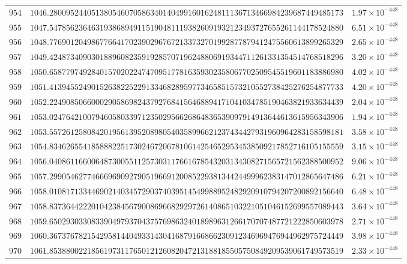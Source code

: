 \documentclass[12pt,reqno]{amsart}
\theoremstyle{remark}
\begin{document}
\begin{longtable}{clc}
$954$ & $1046.2800952440513805460705863401404991601624811136713466984239687449485173$ & $1.97\times 10^{-448}$ \\
$955$ & $1047.5478562364631938689491151904811193826091932123493727655261144178524880$ & $6.51\times 10^{-448}$ \\
$956$ & $1048.7769012049867766417023902967672133732701992877879412475560613899265329$ & $2.65\times 10^{-448}$ \\
$957$ & $1049.4248734090301889608235919285707196248806919344711261331354514768518296$ & $3.20\times 10^{-448}$ \\
$958$ & $1050.6587797492840157020224747095177816359302358067702509545519601183886980$ & $4.02\times 10^{-448}$ \\
$959$ & $1051.4139455249015263822522913346828959773465851573210552738425276254877733$ & $4.20\times 10^{-448}$ \\
$960$ & $1052.2249085066000290586982437927684156468894171041034785190463821933634439$ & $2.04\times 10^{-448}$ \\
$961$ & $1053.0247642100794605803397123502956626864836539097914913644613615956343906$ & $1.94\times 10^{-448}$ \\
$962$ & $1053.5572612580842019561395208980540358996621237434427931960964283158598181$ & $3.58\times 10^{-448}$ \\
$963$ & $1054.8346265541858882251730246720678106142546529534538509217852716105155559$ & $3.15\times 10^{-448}$ \\
$964$ & $1056.0408611660064873005511257303117661678543203134308271565721562388500952$ & $9.06\times 10^{-448}$ \\
$965$ & $1057.2990546277466696909279051966912008522938134424499962383147012865647486$ & $6.21\times 10^{-448}$ \\
$966$ & $1058.0108171334469021403457290374039514549988952482920910794207200892156640$ & $6.48\times 10^{-448}$ \\
$967$ & $1058.8373644222010423845679008696682929726140865103221051046152699557089443$ & $3.64\times 10^{-448}$ \\
$968$ & $1059.6502930330833904979370437576986324018989631266170707487721222850603978$ & $2.71\times 10^{-448}$ \\
$969$ & $1060.3673767821542958144049331430416879166866230912346969476944962975724449$ & $3.98\times 10^{-448}$ \\
$970$ & $1061.8538800221856197311765012126082047213188185505750849209539061749573519$ & $2.33\times 10^{-448}$ \\

\end{longtable}
\end{document}
